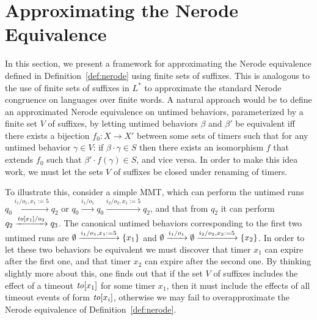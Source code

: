 \section{Approximating the Nerode Equivalence}
\label{sec:approx}

In this section, we present a framework for approximating the Nerode equivalence
defined in Definition~\ref{def:nerode} using finite sets of suffixes. This
is analogous to the use of finite sets of suffixes in $L^*$ to approximate the
standard Nerode congruence on languages over finite words. A natural approach
would be to define an approximated Nerode equivalence on untimed behaviors,
parameterized by a finite set $V$ of suffixes, by letting 
untimed behaviors $\beta$ and $\beta'$ be equivalent
iff there exists a bijection 
$f_0 : X \to X'$ between some sets of timers 
such that for any untimed behavior $\gamma \in V$:
if $\beta \cdot \gamma \in S$ then there exists an isomorphism $f$ that extends $f_0$ such that $\beta' \cdot f(\gamma) \in S$, and vice versa.
In order to make this idea work, we must let the sets $V$ of suffixes be
closed under renaming of timers.

To illustrate this, consider a simple MMT, which can perform the untimed runs
\(
q_0 \xrightarrow{i_1/o_1, x_1:= 5} q_2
\)
or
\(
q_0 \xrightarrow{i_1/o_1} q_0 \xrightarrow{i_2/o_2, x_1:= 5} q_2
\),
and that from $q_2$ it can perform
\(
q_2 \xrightarrow{\mathit{to}[x_1]/o_3} q_3
\).
The canonical untimed behaviors corresponding to the first two
untimed runs are
\(
\emptyset \xrightarrow{i_1/o_1, x_1:= 5} \lbrace x_1\rbrace
\)
and
\(
\emptyset \xrightarrow{i_1/o_1} \emptyset \xrightarrow{i_2/o_2, x_2:= 5} \lbrace x_2\rbrace
\).
In order to let these two behaviors be equivalent we must discover that
timer $x_1$ can expire after the first one, and that
timer $x_2$ can expire after the second one. By thinking slightly more about
this, one finds out that if the set $V$ of suffixes includes
the effect of a timeout $\mathit{to}[x_1]$ for some timer $x_1$, then it must
include the effects of all timeout events of form $\mathit{to}[x_i]$, otherwise we
may fail to overapproximate the Nerode equivalence of Definition~\ref{def:nerode}.


